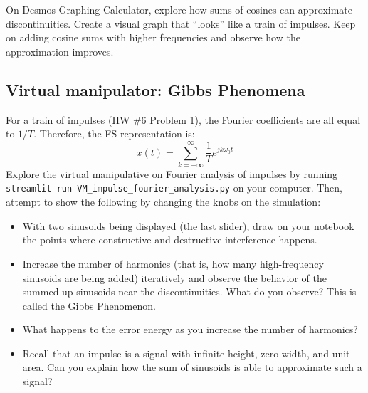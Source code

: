 \documentclass{ee102_notes}
\begin{document}
\begin{popquiz}
On Desmos Graphing Calculator, explore how sums of cosines can approximate discontinuities. Create a visual graph that ``looks'' like a train of impulses.
\popqsplit
Keep on adding cosine sums with higher frequencies and observe how the approximation improves.
\end{popquiz}

\subsection{Virtual manipulator: Gibbs Phenomena}
For a train of impulses (HW \#6 Problem 1), the Fourier coefficients are all equal to \(1/T\). Therefore, the FS representation is:
\[
x(t) = \sum_{k=-\infty}^{\infty} \frac{1}{T} e^{j k \omega_0 t}
\]
Explore the virtual manipulative on Fourier analysis of impulses by running \texttt{streamlit run VM\_impulse\_fourier\_analysis.py} on your computer. Then, attempt to show the following by changing the knobs on the simulation:
\begin{itemize}
    \item With two sinusoids being displayed (the last slider), draw on your notebook the points where constructive and destructive interference happens.
    \item Increase the number of harmonics (that is, how many high-frequency sinusoids are being added) iteratively and observe the behavior of the summed-up sinusoids near the discontinuities. What do you observe? This is called the Gibbs Phenomenon.
    \item What happens to the error energy as you increase the number of harmonics?
    \item Recall that an impulse is a signal with infinite height, zero width, and unit area. Can you explain how the sum of sinusoids is able to approximate such a signal?
\end{itemize}
\end{document}
